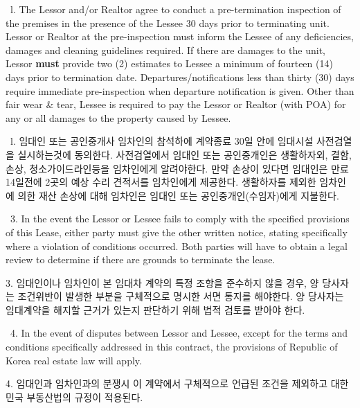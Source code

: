 \documentclass[10pt, letterpaper]{article}
\newcommand{\ul}[1]{\underline{\makebox[#1]{}}}
\newcommand{\init}{\ul{1cm}\ }
\begin{document}
\vspace{3pt}

\init l. The Lessor and/or Realtor agree to conduct a pre-termination inspection of the premises in the presence of the Lessee 30 days prior to terminating unit. Lessor or Realtor at the pre-inspection must inform the Lessee of any deficiencies, damages and cleaning guidelines required. If there are damages to the unit, Lessor \textbf{must} provide two (2) estimates to Lessee a minimum of fourteen (14) days prior to termination date. Departures/notifications less than thirty (30) days require immediate pre-inspection when departure notification is given. Other than fair wear \& tear, Lessee is required to pay the Lessor or Realtor (with POA) for any or all damages to the property caused by Lessee.

\init l. 임대인 또는 공인중개사 임차인의 참석하에 계약종료 30일 안에 임대시설 사전검열을 실시하는것에 동의한다. 사전검열에서 임대인 또는 공인중개인은 생활하자외, 결함, 손상, 청소가이드라인등을 임차인에게 알려야한다. 만약 손상이 있다면 임대인은 만료 14일전에 2곳의 예상 수리 견적서를 임차인에게 제공한다. 생활하자를 제외한 임차인에 의한 재산 손상에 대해 임차인은 임대인 또는 공인중개인(수임자)에게 지불한다.

\vspace{3pt}

\init 3. In the event the Lessor or Lessee fails to comply with the specified provisions of this Lease, either party must give the other written notice, stating specifically where a violation of conditions occurred. Both parties will have to obtain a legal review to determine if there are grounds to terminate the lease.

\hspace{1.2cm} 3. 임대인이나 임차인이 본 임대차 계약의 특정 조항을 준수하지 않을 경우, 양 당사자는 조건위반이 발생한 부분을 구체적으로 명시한 서면 통지를 해야한다. 양 당사자는 임대계약을 해지할 근거가 있는지 판단하기 위해 법적 검토를 받아야 한다.

\vspace{3pt}

\init 4. In the event of disputes between Lessor and Lessee, except for the terms and conditions specifically addressed in this contract, the provisions of Republic of Korea real estate law will apply.

\hspace{1.2cm} 4. 임대인과 임차인과의 분쟁시 이 계약에서 구체적으로 언급된 조건을 제외하고 대한민국 부동산법의 규정이 적용된다.
\end{document}
